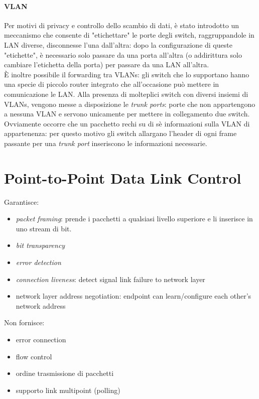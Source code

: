 \paragraph{VLAN}
Per motivi di privacy e controllo dello scambio di dati, è stato introdotto un meccanismo che consente di "etichettare" le porte degli switch, raggruppandole in LAN diverse, disconnesse l'una dall'altra: dopo la configurazione di queste "etichette", è necessario solo passare da una porta all'altra (o addirittura solo cambiare l'etichetta della porta) per passare da una LAN all'altra.\\
È inoltre possibile il forwarding tra VLANs: gli switch che lo supportano hanno una specie di piccolo router integrato che all'occasione può mettere in comunicazione le LAN. Alla presenza di molteplici switch con diversi insiemi di VLANs, vengono messe a disposizione le \textit{trunk ports}: porte che non appartengono a nessuna VLAN e servono unicamente per mettere in collegamento due switch. Ovviamente occorre che un pacchetto rechi su di sè informazioni sulla VLAN di appartenenza: per questo motivo gli switch allargano l'header di ogni frame passante per una \textit{trunk port} inseriscono le informazioni necessarie.\\
\newpage
\section{Point-to-Point Data Link Control}
Garantisce:
\begin{itemize}
	\item \textit{packet framing}: prende i pacchetti a qualsiasi livello superiore e li inserisce in uno stream di bit.
	\item \textit{bit transparency}
	\item \textit{error detection}
	\item \textit{connection liveness}: detect signal link failure to network layer
	\item network layer address negotiation: endpoint can learn/configure each other's network address	
\end{itemize}
Non fornisce:
\begin{itemize}
	\item error connection
	\item flow control
	\item ordine trasmissione di pacchetti
	\item supporto link multipoint (polling)
\end{itemize}

